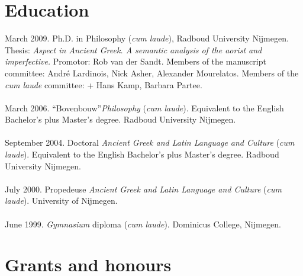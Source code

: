 \documentclass[a4paper,11pt]{article}
\begin{document}
\section*{Education}
March 2009.  Ph.D. in Philosophy (\emph{cum laude}),  Radboud University Nijmegen. Thesis: \emph{Aspect in Ancient Greek. A semantic analysis of the aorist and imperfective.} Promotor: Rob van der Sandt. Members of the manuscript committee: Andr\'e Lardinois, Nick Asher, Alexander Mourelatos. Members of the \emph{cum laude} committee: + Hans Kamp, Barbara Partee.
\\\\
March 2006. ``Bovenbouw''\emph{Philosophy} (\emph{cum laude}). Equivalent to the English Bachelor's plus Master's degree.
Radboud University Nijmegen.\\\\
September 2004. Doctoral \emph{Ancient Greek and Latin Language and Culture} (\emph{cum laude}).  Equivalent to the English Bachelor's plus Master's degree. Radboud University Nijmegen.\\\\
July 2000. Propedeuse \emph{Ancient Greek and Latin Language and
Culture} (\emph{cum laude}). University of Nijmegen.\\\\June 1999.
\emph{Gymnasium} diploma (\emph{cum laude}). Dominicus
College, Nijmegen.\\


\section*{Grants and honours}
\end{document}
